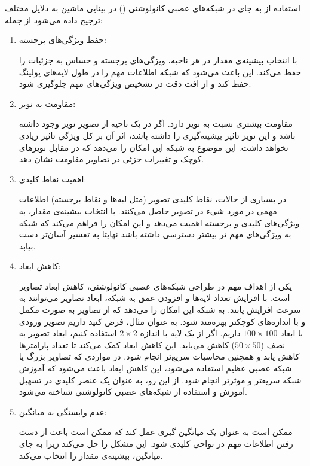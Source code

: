 \documentclass{article}
\begin{document}
\section{}
استفاده از  به جای  در شبکه‌های عصبی کانولوشنی () در بینایی ماشین به دلایل مختلف ترجیح داده می‌شود از جمله:
\begin{enumerate}


\item    حفظ ویژگی‌های برجسته:

          با انتخاب بیشینه‌ی مقدار در هر ناحیه، ویژگی‌های برجسته و حساس به جزئیات را حفظ می‌کند. این باعث می‌شود که شبکه اطلاعات مهم را در طول لایه‌های پولینگ حفظ کند و از افت دقت در تشخیص ویژگی‌های مهم جلوگیری شود.

\item    مقاومت به نویز:

          مقاومت بیشتری نسبت به نویز دارد. اگر در یک ناحیه از تصویر نویز وجود داشته باشد و این نویز تاثیر بیشینه‌گیری را داشته باشد، اثر آن بر کل ویژگی تاثیر زیادی نخواهد داشت. این موضوع به شبکه این امکان را می‌دهد که در مقابل نویز‌های کوچک و تغییرات جزئی در تصاویر مقاومت نشان دهد.

\item    اهمیت نقاط کلیدی:

        در بسیاری از حالات، نقاط کلیدی تصویر (مثل لبه‌ها و نقاط برجسته) اطلاعات مهمی در مورد شیء در تصویر حاصل می‌کنند.   با انتخاب بیشینه‌ی مقدار، به ویژگی‌های کلیدی و برجسته اهمیت می‌دهد و این امکان را فراهم می‌کند که شبکه به ویژگی‌های مهم تر بیشتر دسترسی داشته باشد نهایتا به تفسیر آسان‌تر دست بیابد.

\item    کاهش ابعاد:

        یکی از اهداف مهم در طراحی شبکه‌های عصبی کانولوشنی، کاهش ابعاد تصاویر است. با افزایش تعداد لایه‌ها و افزودن عمق به شبکه، ابعاد تصاویر می‌توانند به سرعت افزایش یابند.  به شبکه این امکان را می‌دهد که از تصاویر به صورت مکمل و با اندازه‌های کوچکتر بهره‌مند شود.
به عنوان مثال، فرض کنید داریم تصویر ورودی با ابعاد $100\times 100$ داریم. اگر از یک لایه  با اندازه $2\times 2$  استفاده کنیم، ابعاد تصویر به نصف ($50\times 50$) کاهش می‌یابد. این کاهش ابعاد کمک می‌کند تا تعداد پارامترها کاهش یابد و همچنین محاسبات سریع‌تر انجام شود.
در مواردی که تصاویر بزرگ یا شبکه عصبی عظیم استفاده می‌شود، این کاهش ابعاد باعث می‌شود که آموزش شبکه سریعتر و موثرتر انجام شود. از این رو،  به عنوان یک عنصر کلیدی در تسهیل آموزش و استفاده از شبکه‌های عصبی کانولوشنی شناخته می‌شود.

\item    عدم وابستگی به میانگین:

          ممکن است به عنوان یک میانگین گیری عمل کند که ممکن است باعث از دست رفتن اطلاعات مهم در نواحی کلیدی شود.  این مشکل را حل می‌کند زیرا به جای میانگین، بیشینه‌ی مقدار را انتخاب می‌کند.


\end{enumerate}
\end{document}
